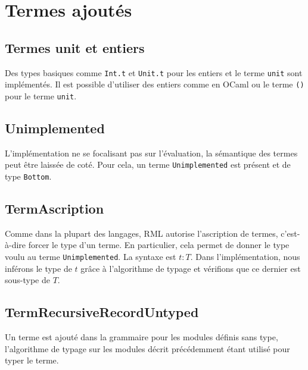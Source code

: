 \section{Termes ajoutés}

\subsection*{Termes unit et entiers}

Des types basiques comme \verb|Int.t| et \verb|Unit.t| pour les entiers et le terme
\verb|unit| sont implémentés. Il est possible d'utiliser des entiers comme en
OCaml ou le terme \verb|()| pour le terme \verb|unit|.

\subsection*{Unimplemented}

L'implémentation ne se focalisant pas sur l'évaluation, la sémantique des termes
peut être laissée de coté. Pour cela, un terme \verb|Unimplemented| est présent
et de type \verb|Bottom|.

\subsection*{TermAscription}

Comme dans la plupart des langages, RML autorise l'ascription de termes,
c'est-à-dire forcer le type d'un terme. En particulier, cela permet de donner le
type voulu au terme \verb|Unimplemented|. La syntaxe est $t : T$. Dans
l'implémentation, nous inférons le type de $t$ grâce à l'algorithme de typage et
vérifions que ce dernier est sous-type de $T$.

\subsection*{TermRecursiveRecordUntyped}

Un terme est ajouté dans la grammaire pour les modules définis sans type,
l'algorithme de typage sur les modules décrit précédemment étant utilisé pour
typer le terme.


%
%
%

